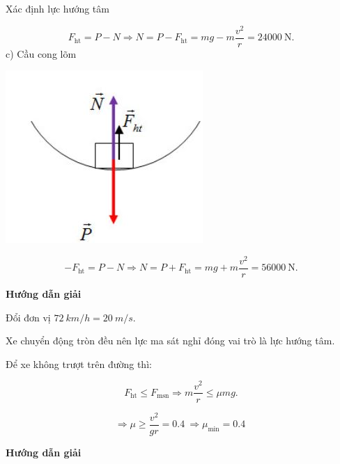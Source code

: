 \begin{dang}{Xác định lực hướng tâm}
{\begin{center}
		\end{center}
		\begin{equation*}
			F_{\text{ht}} =P-N\Rightarrow  N=P-F_{\text{ht}} =mg-m\dfrac{v^2}{r}=24000\ \text{N}.
		\end{equation*}
		c) Cầu cong lõm
		\begin{center}
			\includegraphics[scale=0.5]{../figs/VN10-PH-16-L-013-1-V2-03.JPG}
		\end{center}
		\begin{equation*}
			-F_{\text{ht}} =P-N\Rightarrow  N=P+F_{\text{ht}} =mg+m\dfrac{v^2}{r}=56000\ \text{N}.
		\end{equation*}
	}
	{	\begin{center}
			\textbf{Hướng dẫn giải}
		\end{center}
		
		Đổi đơn vị $\SI{72}{km/h}=\SI{20}{m/s}$.
		
		Xe chuyển động tròn đều nên lực ma sát nghỉ đóng vai trò là lực hướng tâm.
		
		Để xe không trượt trên đường thì:
		
		$$F_\text{ht} \leq F_\text{msn} \Rightarrow m\dfrac{v^2}{r} \leq \mu mg.$$
		
		$$\Rightarrow \mu \geq \dfrac{v^2}{gr} = \SI{0,4}{}\Rightarrow \mu_\text{min} =\SI{0,4}{}$$
	}
	{	\begin{center}
			\textbf{Hướng dẫn giải}
		\end{center}
		
}
\end{dang}
